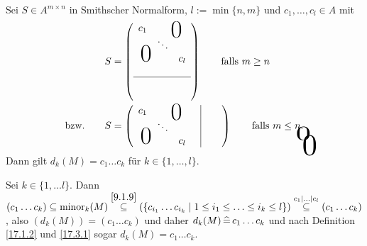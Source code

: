 \documentclass[../../main.tex]{subfiles}
\begin{document}
\begin{lem}\label{17.3.4}
Sei $S\in A^{m\times n}$ in Smithscher Normalform, $l:=\min\{n,m\}$ und $c_1,\ldots ,c_l\in A$ mit \begin{align*}
&S=\left(\begin{array}{c c c}
c_1& \multicolumn{2}{c}{\text{\kern 1em\smash{\raisebox{-1.5ex}{\Huge 0}}}} \\
& \ddots &  \\
\multicolumn{2}{c}{\text{\kern-1.5em\smash{\raisebox{0ex}{\Huge 0}}}} &c_l\\
& &\\
\hline 
&\tikz[remember picture]\node[inner sep=0pt] (a){ };&\\
& &
\end{array}\right)\qquad\text{falls }m\ge n\\
\text{bzw.}\qquad&S=\left(\begin{array}{c c c c|c c}
 c_1& \multicolumn{2}{c}{\text{\kern 1em\smash{\raisebox{-1.5ex}{\Huge 0}}}}& &\tikz[remember picture]\node[inner sep=0pt] (b){ }; &\\
& \ddots & & \\
\multicolumn{2}{c}{\text{\kern-1.5em\smash{\raisebox{0ex}{\Huge 0}}}}& c_l& &\\
\end{array}\right)\qquad\text{falls }m\le n.
\begin{tikzpicture}[overlay, remember picture]
\node at (a.north) [anchor=center,yshift=-0.2cm, yscale=2,xscale=3] {$0$};
\node at (b.east) [anchor=center, xshift=0.2cm,yshift=-0.6cm,  xscale=3, yscale=3] {$0$};
\end{tikzpicture}
\end{align*}
Dann gilt $d_k(M)=c_1\ldots c_k$ für $k\in\{1,\ldots ,l\}$.
\end{lem}
\begin{cproof}
Sei $k\in\{1,\ldots l\}$. Dann $(c_1\ldots c_k)\subseteq \operatorname{minor}_k(M)\stackrel{\ref{9.1.9}}{\subseteq}(\{c_{i_1}\ldots c_{i_k}\mid 1\le i_1\le\ldots \le i_k\le l\})\stackrel{c_1\mid\ldots \mid c_l}{\subseteq}(c_1\ldots c_k)$, also $(d_k(M))=(c_1\ldots c_k)$ und daher $d_k(M)\,\widehat{=}\, c_1\ldots c_k$ und nach Definition \ref{17.1.2} und \ref{17.3.1} sogar $d_k(M)=c_1\ldots c_k$.
\end{cproof}
\end{document}
